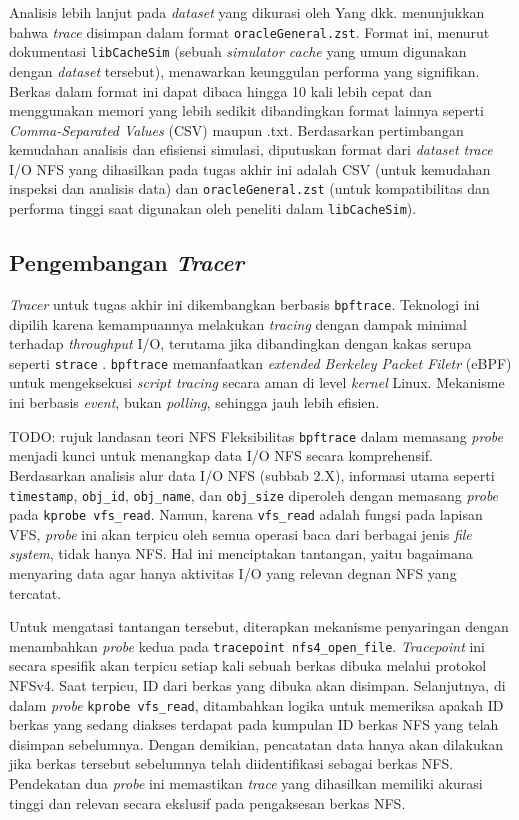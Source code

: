Analisis lebih lanjut pada \textit{dataset} yang dikurasi oleh Yang dkk. menunjukkan bahwa \textit{trace} disimpan dalam format \texttt{oracleGeneral.zst}. Format ini, menurut dokumentasi \texttt{libCacheSim} (sebuah \textit{simulator cache} yang umum digunakan dengan \textit{dataset} tersebut), menawarkan keunggulan performa yang signifikan. Berkas dalam format ini dapat dibaca hingga 10 kali lebih cepat dan menggunakan memori yang lebih sedikit dibandingkan format lainnya seperti \textit{Comma-Separated Values} (CSV) maupun .txt. Berdasarkan pertimbangan kemudahan analisis dan efisiensi simulasi, diputuskan format dari \textit{dataset trace} I/O NFS yang dihasilkan pada tugas akhir ini adalah CSV (untuk kemudahan inspeksi dan analisis data) dan \texttt{oracleGeneral.zst} (untuk kompatibilitas dan performa tinggi saat digunakan oleh peneliti dalam \texttt{libCacheSim}).

\subsection{Pengembangan \textit{Tracer}}
\textit{Tracer} untuk tugas akhir ini dikembangkan berbasis \texttt{bpftrace}. Teknologi ini dipilih karena kemampuannya melakukan \textit{tracing} dengan dampak minimal terhadap \textit{throughput} I/O, terutama jika dibandingkan dengan kakas serupa seperti \texttt{strace} \parencite{TracerFile}. \texttt{bpftrace} memanfaatkan \textit{extended Berkeley Packet Filetr} (eBPF) untuk mengeksekusi \textit{script tracing} secara aman di level \textit{kernel} Linux. Mekanisme ini berbasis \textit{event}, bukan \textit{polling}, sehingga jauh lebih efisien.

TODO: rujuk landasan teori NFS
Fleksibilitas \texttt{bpftrace} dalam memasang \textit{probe} menjadi kunci untuk menangkap data I/O NFS secara komprehensif. Berdasarkan analisis alur data I/O NFS (subbab 2.X), informasi utama seperti \texttt{timestamp}, \texttt{obj\_id}, \texttt{obj\_name}, dan \texttt{obj\_size} diperoleh dengan memasang \textit{probe} pada \texttt{kprobe vfs\_read}. Namun, karena \texttt{vfs\_read} adalah fungsi pada lapisan VFS, \textit{probe} ini akan terpicu oleh semua operasi baca dari berbagai jenis \textit{file system}, tidak hanya NFS. Hal ini menciptakan tantangan, yaitu bagaimana menyaring data agar hanya aktivitas I/O yang relevan degnan NFS yang tercatat.

Untuk mengatasi tantangan tersebut, diterapkan mekanisme penyaringan dengan menambahkan \textit{probe} kedua pada \texttt{tracepoint nfs4\_open\_file}. \textit{Tracepoint} ini secara spesifik akan terpicu setiap kali sebuah berkas dibuka melalui protokol NFSv4. Saat terpicu, ID dari berkas yang dibuka akan disimpan. Selanjutnya, di dalam \textit{probe} \texttt{kprobe vfs\_read}, ditambahkan logika untuk memeriksa apakah ID berkas yang sedang diakses terdapat pada kumpulan ID berkas NFS yang telah disimpan sebelumnya. Dengan demikian, pencatatan data hanya akan dilakukan jika berkas tersebut sebelumnya telah diidentifikasi sebagai berkas NFS. Pendekatan dua \textit{probe} ini memastikan \textit{trace} yang dihasilkan memiliki akurasi tinggi dan relevan secara ekslusif pada pengaksesan berkas NFS.

